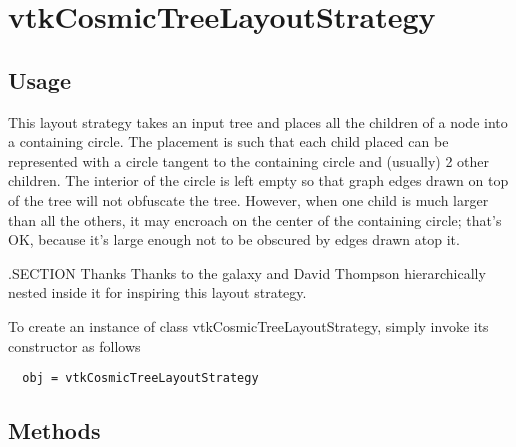 \section{vtkCosmicTreeLayoutStrategy}

\subsection{Usage}

 This layout strategy takes an input tree and places all the children of a
 node into a containing circle. The placement is such that each child
 placed can be represented with a circle tangent to the containing circle
 and (usually) 2 other children. The interior of the circle is left empty
 so that graph edges drawn on top of the tree will not obfuscate the tree.
 However, when one child is much larger than all the others, it may
 encroach on the center of the containing circle; that's OK, because it's
 large enough not to be obscured by edges drawn atop it.

 .SECTION Thanks
 Thanks to the galaxy and David Thompson hierarchically nested inside it
 for inspiring this layout strategy.

To create an instance of class vtkCosmicTreeLayoutStrategy, simply
invoke its constructor as follows
\begin{verbatim}
  obj = vtkCosmicTreeLayoutStrategy
\end{verbatim}
\subsection{Methods}

